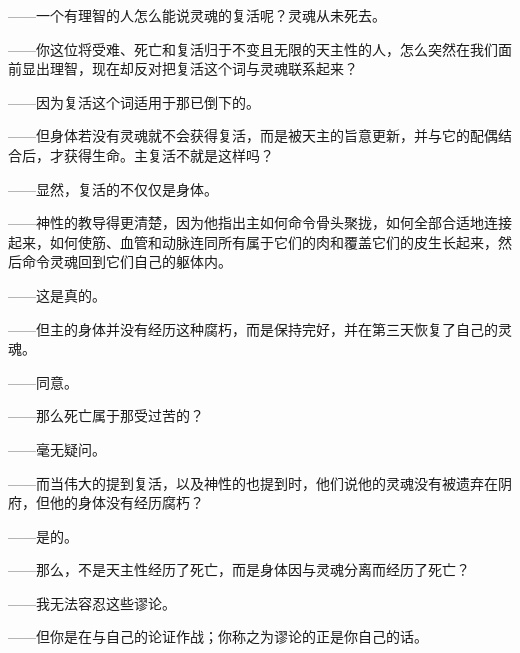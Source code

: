 ——一个有理智的人怎么能说灵魂的复活呢？灵魂从未死去。\par

——你这位将受难、死亡和复活归于不变且无限的天主性的人，怎么突然在我们面前显出理智，现在却反对把复活这个词与灵魂联系起来？\par

——因为复活这个词适用于那已倒下的。\par

——但身体若没有灵魂就不会获得复活，而是被天主的旨意更新，并与它的配偶结合后，才获得生命。主复活不就是这样吗？\par

——显然，复活的不仅仅是身体。\par

——神性的教导得更清楚，因为他指出主如何命令骨头聚拢，如何全部合适地连接起来，如何使筋、血管和动脉连同所有属于它们的肉和覆盖它们的皮生长起来，然后命令灵魂回到它们自己的躯体内。\par

——这是真的。\par

——但主的身体并没有经历这种腐朽，而是保持完好，并在第三天恢复了自己的灵魂。\par

——同意。\par

——那么死亡属于那受过苦的？\par

——毫无疑问。\par

——而当伟大的提到复活，以及神性的也提到时，他们说他的灵魂没有被遗弃在阴府，但他的身体没有经历腐朽？\par

——是的。\par

——那么，不是天主性经历了死亡，而是身体因与灵魂分离而经历了死亡？\par

——我无法容忍这些谬论。\par

——但你是在与自己的论证作战；你称之为谬论的正是你自己的话。\par

